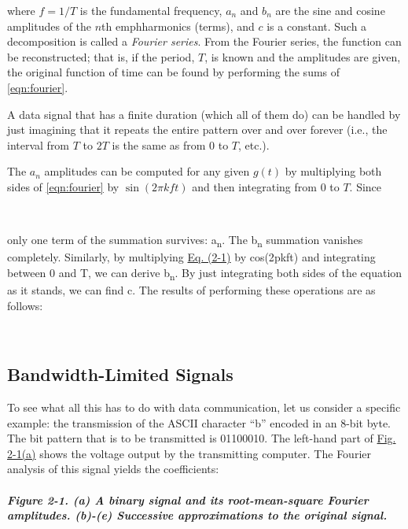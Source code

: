 where $f = 1/T$ is the fundamental frequency, $a_n$ and $b_n$ are the sine and cosine amplitudes of the $n$th emph{harmonics} (terms), and $c$ is a constant.
Such a decomposition is called a \emph{Fourier series}.
From the Fourier series, the function can be reconstructed; that is, if the period, $T$, is known and the amplitudes are given, the original function of time can be found by
performing the sums of \cref{eqn:fourier}.

A data signal that has a finite duration (which all of them do) can be
handled by just imagining that it repeats the entire pattern over and
over forever (i.e., the interval from $T$ to $2T$ is the same as from $0$ to $T$, etc.).

The $a_n$ amplitudes can be computed for any given $g(t)$ by multiplying both sides of \cref{eqn:fourier} by $\sin(2\pi kft)$ and then integrating from 0 to $T$.
Since


~

only one term of the summation survives: {a}{\textsubscript{n}}{.} The
{b}{\textsubscript{n}} summation vanishes completely. Similarly, by
multiplying
\protect\hyperlink{0130661023_ch02lev1sec1.htmlux5cux23ch02eq01}{Eq.
(2-1)} by cos(2{p}{kft}) and integrating between 0 and {T}, we can
derive {b}{\textsubscript{n}}{.} By just integrating both sides of the
equation as it stands, we can find {c}. The results of performing these
operations are as follows:


~

\protect\hypertarget{0130661023_ch02lev1sec1.htmlux5cux23ch02lev2sec2}{}{}

\subsection{Bandwidth-Limited Signals}

To see what all this has to do with data communication, let us consider
a specific example: the transmission of the ASCII character ``b''
encoded in an 8-bit byte. The bit pattern that is to be transmitted is
01100010. The left-hand part of
\protect\hyperlink{0130661023_ch02lev1sec1.htmlux5cux23ch02fig01}{Fig.
2-1(a)} shows the voltage output by the transmitting computer. The
Fourier analysis of this signal yields the coefficients:

\subparagraph[Figure 2-1. (a) A binary signal and its root-mean-square
Fourier amplitudes. (b)-(e) Successive approximations to the original
signal.]{\texorpdfstring{\protect\hypertarget{0130661023_ch02lev1sec1.htmlux5cux23ch02fig01}{}{}Figure
2-1. (a) A binary signal and its root-mean-square Fourier amplitudes.
(b)-(e) Successive approximations to the original
signal.}{Figure 2-1. (a) A binary signal and its root-mean-square Fourier amplitudes. (b)-(e) Successive approximations to the original signal.}}

